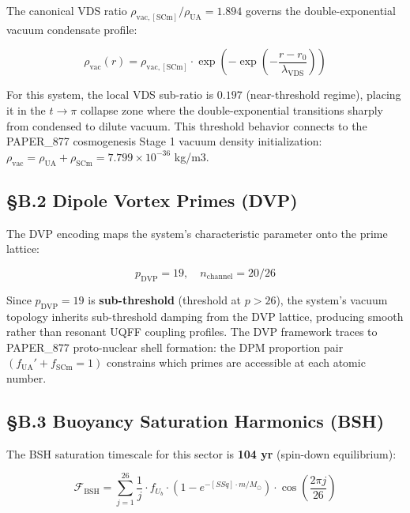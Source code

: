 \documentclass[12pt,a4paper]{article}
\begin{document}
The canonical VDS ratio $\rho_{\mathrm{vac,[SCm]}} / \rho_{\mathrm{UA}} = 1.894$ governs the double-exponential vacuum condensate profile:

\begin{equation}
\rho_{\mathrm{vac}}(r) = \rho_{\mathrm{vac,[SCm]}} \cdot \exp\!\left(-\exp\!\left(-\frac{r - r_0}{\lambda_{\mathrm{VDS}}}\right)\right)
\end{equation}

For this system, the local VDS sub-ratio is $0.197$ (near-threshold regime), placing it in the $t \to \pi$ collapse zone where the double-exponential transitions sharply from condensed to dilute vacuum. This threshold behavior connects to the PAPER\_877 cosmogenesis Stage 1 vacuum density initialization: $\rho_{\mathrm{vac}} = \rho_{\mathrm{UA}} + \rho_{\mathrm{SCm}} = 7.799 \times 10^{-36}$ kg/m3.

\subsection{\S{}B.2 Dipole Vortex Primes (DVP)}

The DVP encoding maps the system's characteristic parameter onto the prime lattice:

\begin{equation}
p_{\mathrm{DVP}} = 19, \quad n_{\mathrm{channel}} = 20/26
\end{equation}

Since $p_{\mathrm{DVP}} = 19$ is \textbf{sub-threshold} (threshold at $p > 26$), the system's vacuum topology inherits sub-threshold damping from the DVP lattice, producing smooth rather than resonant UQFF coupling profiles. The DVP framework traces to PAPER\_877 proto-nuclear shell formation: the DPM proportion pair $(f_{\mathrm{UA}}' + f_{\mathrm{SCm}} = 1)$ constrains which primes are accessible at each atomic number.

\subsection{\S{}B.3 Buoyancy Saturation Harmonics (BSH)}

The BSH saturation timescale for this sector is \textbf{104 yr} (spin-down equilibrium):

\begin{equation}
\mathcal{F}_{\mathrm{BSH}} = \sum_{j=1}^{26} \frac{1}{j} \cdot f_U_b \cdot \left(1 - e^{-[SSq] \cdot m/M_\odot}\right) \cdot \cos\!\left(\frac{2\pi j}{26}\right)
\end{equation}
\end{document}
